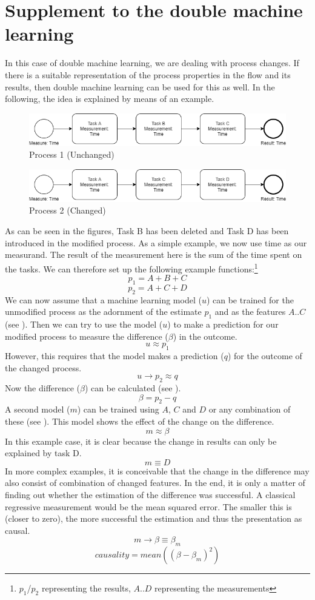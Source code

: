 \chapter{Supplement to the double machine learning}
In this case of double machine learning, we are dealing with process changes. If there is a suitable representation of the process properties in the flow and its results, then double machine learning can be used for this as well. In the following, the idea is explained by means of an example.
\begin{figure}[H]
    \centering
    \includegraphics[width=0.99\textwidth-2\fboxsep-2\fboxrule]{includes/p1.png}
    \caption{Process 1 (Unchanged)}
    \label{p1}
\end{figure}
\begin{figure}[H]
    \centering
    \includegraphics[width=0.99\textwidth-2\fboxsep-2\fboxrule]{includes/p2.png}
    \caption{Process 2 (Changed)}
    \label{p2}
\end{figure}
As can be seen in the figures, Task B has been deleted and Task D has been introduced in the modified process. As a simple example, we now use time as our measurand. The result of the measurement here is the sum of the time spent on the tasks. We can therefore set up the following example functions:\footnote{$p_1$/$p_2$ representing the results, $A$..$D$ representing the measurements}\\
\[p_1 = A + B + C\]
\[p_2 = A + C + D\]
We can now assume that a machine learning model ($u$) can be trained for the unmodified process as the adornment of the estimate $p_1$ and as the features $A$..$C$ (see ). Then we can try to use the model ($u$) to make a prediction for our modified process to measure the difference ($\beta$) in the outcome.
\[u \approx p_1\]
However, this requires that the model makes a prediction ($q$) for the outcome of the changed process.
\[u \rightarrow p_2 \approx q\]
Now the difference ($\beta$) can be calculated (see ).
\[\beta = p_2 - q\]
A second model ($m$) can be trained using $A$, $C$ and $D$ or any combination of these (see ). This model shows the effect of the change on the difference.
\[m \approx \beta\]
In this example case, it is clear because the change in results can only be explained by task D.
\[m \equiv D\]
In more complex examples, it is conceivable that the change in the difference may also consist of combination of changed features. In the end, it is only a matter of finding out whether the estimation of the difference was successful. A classical regressive measurement would be the mean squared error. The smaller this is (closer to zero), the more successful the estimation and thus the presentation as causal.
\[m \rightarrow \beta \equiv \beta_m\]
\[causality = mean((\beta-\beta_m)^2)\]
\clearpage